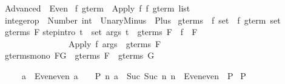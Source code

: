 %
\begin{isabellebody}%
\def\isabellecontext{Advanced}%
\isanewline
{}\ Advanced\ {\isacharequal}\ Even{\isacharcolon}\isanewline
\isanewline
\isanewline
\isamarkupfalse%
\ {\isacharprime}f\ gterm\ {\isacharequal}\ Apply\ {\isacharprime}f\ {\isachardoublequote}{\isacharprime}f\ gterm\ list{\isachardoublequote}\isanewline
\isanewline
\isamarkupfalse%
\ integer{\isacharunderscore}op\ {\isacharequal}\ Number\ int\ {\isacharbar}\ UnaryMinus\ {\isacharbar}\ Plus\isanewline
\isanewline
\isamarkupfalse%
\ gterms\ {\isacharcolon}{\isacharcolon}\ {\isachardoublequote}{\isacharprime}f\ set\ {\isasymRightarrow}\ {\isacharprime}f\ gterm\ set{\isachardoublequote}\isanewline
\isamarkupfalse%
\ {\isachardoublequote}gterms\ F{\isachardoublequote}\isanewline
{}\isanewline
step{\isacharbrackleft}intro{\isacharbang}{\isacharbrackright}{\isacharcolon}\ {\isachardoublequote}{\isasymlbrakk}{\isasymforall}t\ {\isasymin}\ set\ args{\isachardot}\ t\ {\isasymin}\ gterms\ F{\isacharsemicolon}\ \ f\ {\isasymin}\ F{\isasymrbrakk}\isanewline
\ \ \ \ \ \ \ \ \ \ \ \ \ \ \ {\isasymLongrightarrow}\ {\isacharparenleft}Apply\ f\ args{\isacharparenright}\ {\isasymin}\ gterms\ F{\isachardoublequote}\isanewline
\isanewline
\isamarkupfalse%
\ gterms{\isacharunderscore}mono{\isacharcolon}\ {\isachardoublequote}F{\isasymsubseteq}G\ {\isasymLongrightarrow}\ gterms\ F\ {\isasymsubseteq}\ gterms\ G{\isachardoublequote}\isanewline
\isamarkupfalse%
\isamarkupfalse%
\isamarkupfalse%
\isamarkuptrue%
\isamarkupfalse%
\isamarkupfalse%
%
\begin{isamarkuptext}%
\begin{isabelle}%
\ \ \ \ \ {\isasymlbrakk}a\ {\isasymin}\ Even{\isachardot}even{\isacharsemicolon}\ a\ {\isacharequal}\ {}\ {\isasymLongrightarrow}\ P{\isacharsemicolon}\ {\isasymAnd}n{\isachardot}\ {\isasymlbrakk}a\ {\isacharequal}\ Suc\ {\isacharparenleft}Suc\ n{\isacharparenright}{\isacharsemicolon}\ n\ {\isasymin}\ Even{\isachardot}even{\isasymrbrakk}\ {\isasymLongrightarrow}\ P{\isasymrbrakk}\isanewline
\isaindent{\ \ \ \ \ }{\isasymLongrightarrow}\ P%
\end{isabelle}


\end{isamarkuptext}
\end{isabellebody}
